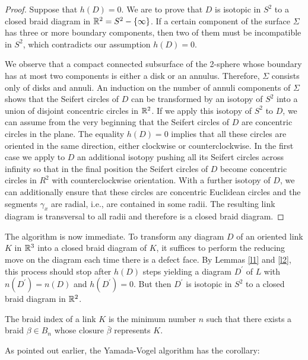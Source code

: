 \begin{proof}
  Suppose that $h(D) = 0$. We are to prove that $D$ is isotopic in $S^2$ to a closed braid diagram in $\mathbb{R}^2 = S^2 - \{\infty\}$. If a certain component
of the surface $\Sigma$ has three or more boundary components, then two of them
must be incompatible in $S^2$, which contradicts our assumption $h(D) = 0$.

  We observe that a compact connected subsurface of the 2-sphere whose boundary has at most two components is either a disk or an annulus. Therefore, $\Sigma$ consists only of disks and annuli. An induction on the number of annuli components of $\Sigma$ shows that the Seifert circles of $D$ can be transformed by an isotopy of $S^2$ into a union of disjoint concentric circles in $\mathbb{R}^2$. If we apply this isotopy of $S^2$ to $D$, we can assume from the very beginning that the Seifert circles of $D$ are concentric circles in the plane. The equality $h(D) = 0$ implies that all these circles are oriented
in the same direction, either clockwise or counterclockwise. In the ﬁrst case we apply to $D$ an additional isotopy pushing all its Seifert circles across infinity so that in the ﬁnal position the Seifert circles of $D$ become concentric circles in $R^2$ with counterclockwise orientation. With a further isotopy of $D$, we can additionally ensure that these circles are concentric Euclidean circles and the segments $\gamma_x$ are radial, i.e., are contained in some radii. The resulting link diagram is transversal to all radii and therefore is a closed braid diagram.
\end{proof}

The algorithm is now immediate. To transform any diagram $D$ of an oriented link $K$ in $\mathbb{R}^3$ into a closed braid diagram of $K$, it suffices to perform the reducing move on the diagram each time there is a defect face. By Lemmas \ref{l1} and \ref{l2}, this process should stop after $h(D)$ steps yielding a diagram $D^{\prime}$ of $L$ with $n(D^{\prime}) = n(D)$ and $h(D^{\prime}) = 0$. But then $D^{\prime}$ is isotopic in $S^2$ to a closed braid diagram in $\mathbb{R}^2$. 

\begin{definition}
  The braid index of a link $K$ is the minimum number $n$ such that there exists a braid $\beta \in B_n$ whose closure $\bar{\beta}$ represents $K$.
\end{definition}

As pointed out earlier, the Yamada-Vogel algorithm has the corollary:
  
